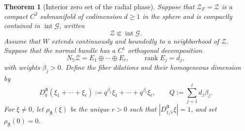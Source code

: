 \documentclass[11pt]{amsart}
\numberwithin{equation}{section}
\newtheorem{theorem}{Theorem}[section]
\theoremstyle{definition}
\theoremstyle{remark}
\DeclareMathOperator{\rank}{rank}
\begin{document}
\begin{theorem}[Interior zero set of the radial phase]
\label{thm:weibull-interior-zero}
Suppose that $\mathcal Z_F=\mathcal Z$ is a compact $C^2$ submanifold of
codimension $d\ge1$ in the sphere and is compactly contained in
$\operatorname{int}\mathcal G$, written
\[
 \mathcal Z\Subset\operatorname{int}\mathcal G.
\]
Assume that $W$ extends continuously and boundedly to a neighborhood of
$\mathcal Z$.
Suppose that the normal bundle has a $C^1$ orthogonal decomposition
\[
 N_{\mathbb S}\mathcal Z=E_1\oplus\cdots\oplus E_\ell,
 \qquad \rank E_j=d_j,
\]
with weights $\beta_j>0$.  Define the fiber dilations and their homogeneous
dimension by
\begin{equation}\label{eq:weibull-interior-dilation}
 D_q^{\bm\beta}(\xi_1+\cdots+\xi_\ell)
 :=q^{\beta_1}\xi_1+\cdots+q^{\beta_\ell}\xi_\ell,
 \qquad
 Q:=\sum_{j=1}^\ell d_j\beta_j.
\end{equation}
For $\xi\ne0$, let $\rho_{\bm\beta}(\xi)$ be the unique $r>0$ such
that $|D_{1/r}^{\bm\beta}\xi|=1$, and set
$\rho_{\bm\beta}(0)=0$.


\end{theorem}
\end{document}
